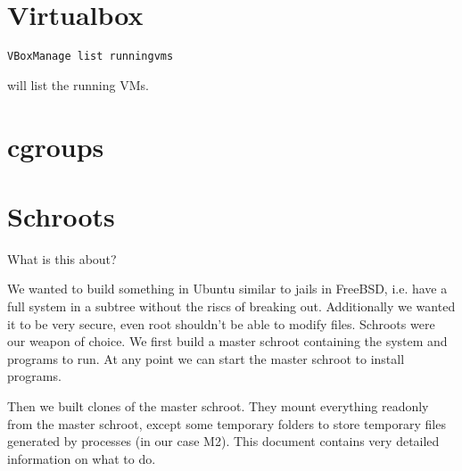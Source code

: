 \documentclass[a4paper]{book}
\begin{document}
\chapter{Virtualbox}

\begin{verbatim}
VBoxManage list runningvms
\end{verbatim}
will list the running VMs.
\chapter{cgroups}
\chapter{Schroots}
What is this about?

We wanted to build something in Ubuntu similar to jails in FreeBSD, i.e. have a
full system in a subtree without the riscs of breaking out.  Additionally we
wanted it to be very secure, even root shouldn't be able to modify files.
Schroots were our weapon of choice. We first build a master schroot containing
the system and programs to run. At any point we can start the master schroot to
install programs.

Then we built clones of the master schroot. They mount everything readonly from
the master schroot, except some temporary folders to store temporary files
generated by processes (in our case M2). This document contains very detailed
information on what to do.

\end{document}
